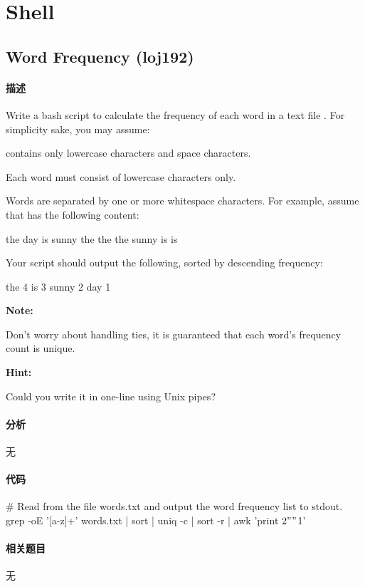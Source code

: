 \chapter{Shell}

\section{Word Frequency (loj192)} %
\label{sec:word-frequency}


\subsubsection{描述}
Write a bash script to calculate the frequency of each word in a text file .
For simplicity sake, you may assume:
\begindot
\item {} contains only lowercase characters and space  characters.
\item Each word must consist of lowercase characters only.
\item Words are separated by one or more whitespace characters.
\myenddot
For example, assume that  has the following content:
\begin{Code}
the day is sunny the the
the sunny is is
\end{Code}
Your script should output the following, sorted by descending frequency:
\begin{Code}
the 4
is 3
sunny 2
day 1
\end{Code}

\textbf{Note:}

Don't worry about handling ties, it is guaranteed that each word's frequency count is unique.

\textbf{Hint:}

Could you write it in one-line using Unix pipes?

\subsubsection{分析}
无

\subsubsection{代码}
\begin{Code}
# Read from the file words.txt and output the word frequency list to stdout.
grep -oE '[a-z]+' words.txt | sort | uniq -c | sort -r | awk '{print $2" "$1}' 
\end{Code}

\subsubsection{相关题目}
无
